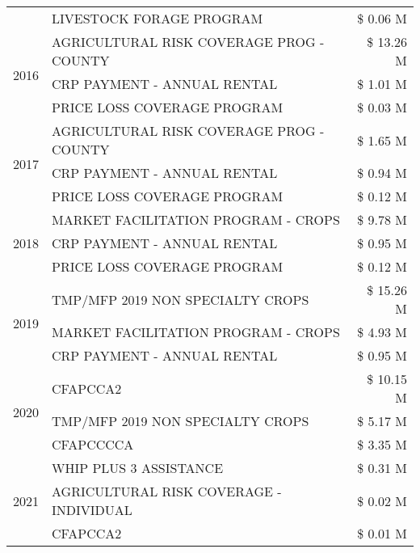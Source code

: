 \begin{tabular}{llr}
 & LIVESTOCK FORAGE PROGRAM & \$ 0.06 M \\
\cline{1-3}
\multirow[t]{3}{*}{2016} & AGRICULTURAL RISK COVERAGE PROG - COUNTY      & \$ 13.26 M \\
 & CRP PAYMENT - ANNUAL RENTAL                   & \$ 1.01 M \\
 & PRICE LOSS COVERAGE PROGRAM                   & \$ 0.03 M \\
\cline{1-3}
\multirow[t]{3}{*}{2017} & AGRICULTURAL RISK COVERAGE PROG - COUNTY & \$ 1.65 M \\
 & CRP PAYMENT - ANNUAL RENTAL & \$ 0.94 M \\
 & PRICE LOSS COVERAGE PROGRAM & \$ 0.12 M \\
\cline{1-3}
\multirow[t]{3}{*}{2018} & MARKET FACILITATION PROGRAM - CROPS & \$ 9.78 M \\
 & CRP PAYMENT - ANNUAL RENTAL & \$ 0.95 M \\
 & PRICE LOSS COVERAGE PROGRAM & \$ 0.12 M \\
\cline{1-3}
\multirow[t]{3}{*}{2019} & TMP/MFP 2019 NON SPECIALTY CROPS & \$ 15.26 M \\
 & MARKET FACILITATION PROGRAM - CROPS & \$ 4.93 M \\
 & CRP PAYMENT - ANNUAL RENTAL & \$ 0.95 M \\
\cline{1-3}
\multirow[t]{3}{*}{2020} & CFAPCCA2 & \$ 10.15 M \\
 & TMP/MFP 2019 NON SPECIALTY CROPS & \$ 5.17 M \\
 & CFAPCCCCA & \$ 3.35 M \\
\cline{1-3}
\multirow[t]{3}{*}{2021} & WHIP PLUS 3 ASSISTANCE & \$ 0.31 M \\
 & AGRICULTURAL RISK COVERAGE - INDIVIDUAL & \$ 0.02 M \\
 & CFAPCCA2 & \$ 0.01 M \\
\cline{1-3}
\bottomrule
\end{tabular}
